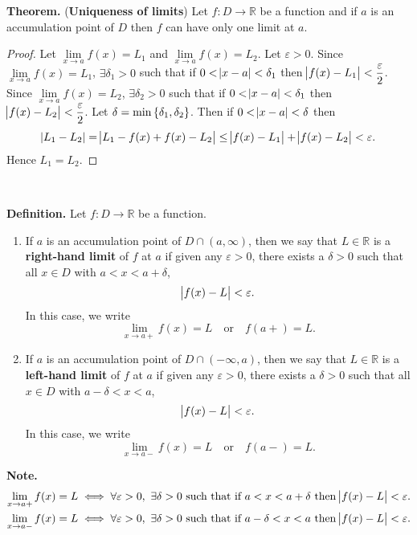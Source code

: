 \documentclass[12pt,a4paper]{article}
\newcommand{\dispsty}{\displaystyle}
\begin{document}
\begin{tcolorbox}[colback=white]
	\textbf{Theorem.} (\textbf{Uniqueness of limits}) Let $f:D\to\mathbb{R}$ be a function and if $a$ is an accumulation point of $D$ then $f$ can have only one limit at $a$.\tcblower\begin{proof}
		Let $\lim\limits_{x\to a}f(x)=L_1$ and $\lim\limits_{x\to a}f(x)=L_2$. Let $\varepsilon>0$. Since $\lim\limits_{x\to a}f(x)=L_1$, $\exists\delta_1>0$ such that if $0<\abs{x-a}<\delta_1$ then $\dispsty\abs{f(x)-L_1}<\frac{\varepsilon}{2}$. Since $\lim\limits_{x\to a}f(x)=L_2$, $\exists\delta_2>0$ such that if $0<\abs{x-a}<\delta_1$ then $\dispsty\abs{f(x)-L_2}<\frac{\varepsilon}{2}$. Let $\delta=\min\set{\delta_1,\delta_2}$. Then if $0<\abs{x-a}<\delta$ then \[
		\abs{L_1-L_2}=\abs{L_1-f(x)+f(x)-L_2}\leq\abs{f(x)-L_1}+\abs{f(x)-L_2}<\varepsilon.
		\] Hence $L_1=L_2$.
	\end{proof}
\end{tcolorbox}\
\\
\begin{tcolorbox}[colback=white]
	\textbf{Definition.} Let $f:D\to\mathbb{R}$ be a function. \begin{enumerate}
		\item If $a$ is an accumulation point of $D\cap(a,\infty)$, then we say that $L\in\mathbb{R}$ is a \textbf{right-hand limit} of $f$ at $a$ if given any $\varepsilon>0$, there exists a $\delta>0$ such that all $x\in D$ with $a<x<a+\delta$, \[
		\abs{f(x)-L}<\varepsilon.
		\] In this case, we write \[
		\lim\limits_{x\to a+}f(x)=L\quad\text{or}\quad f(a+)=L.
		\]
		\item If $a$ is an accumulation point of $D\cap(-\infty,a)$, then we say that $L\in\mathbb{R}$ is a \textbf{left-hand limit} of $f$ at $a$ if given any $\varepsilon>0$, there exists a $\delta>0$ such that all $x\in D$ with $a-\delta<x<a$, \[
		\abs{f(x)-L}<\varepsilon.
		\] In this case, we write \[
		\lim\limits_{x\to a-}f(x)=L\quad\text{or}\quad f(a-)=L.
		\]
	\end{enumerate}\tcblower
	\textbf{Note.} \begin{align*}
	\lim\limits_{x\to a+}f(x)=L &\iff\forall\varepsilon>0,\ \exists\delta>0\ \text{such that if $a<x<a+\delta$ then $\abs{f(x)-L}<\varepsilon$}.\\
	\lim\limits_{x\to a-}f(x)=L &\iff\forall\varepsilon>0,\ \exists\delta>0\ \text{such that if $a-\delta<x<a$ then $\abs{f(x)-L}<\varepsilon$}.
	\end{align*}
\end{tcolorbox}
\end{document}
